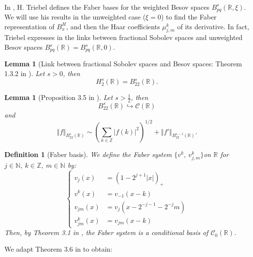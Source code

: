\documentclass[11pt]{enstaPRE}
\newtheorem{defi}{Definition}
\newtheorem{lem}[theo]{Lemma}
\newcommand{\norme}[1]{\left\Vert #1\right\Vert}
\newcommand{\R}{\mathbb{R}}
\newcommand{\Z}{\mathbb{Z}}
\newcommand{\N}{\mathbb{N}}
\begin{document}
\paragraph{}
In \cite{Tri-fab}, H. Triebel defines the Faber bases for the weighted Besov spaces $B^{s}_{pq}(\R,\xi)$. We will use his results in the unweighted case ($\xi = 0$) to find the Faber representation of $B^H_x$, and then the Haar coefficients $\mu^k_{j,m}$ of its derivative. In fact, Triebel expresses in \cite{Tri-fun} the links between fractional Sobolev spaces and unweighted Besov spaces $B^{s}_{pq}(\R)=B^{s}_{pq}(\R,0)$.

\begin{lem}[Link between fractional Sobolev spaces and Besov spaces: Theorem 1.3.2 in \cite{Tri-fun}]
    Let $s>0$, then \begin{equation}
    H^s_2(\R)=B^s_{22}(\R).
    \end{equation}
\end{lem}

\begin{lem}[Proposition 3.5 in \cite{Tri-fab}]\label{emb}
    Let $s>\frac{1}{2}$, then 
    \begin{equation}
    B^s_{22}(\R) \hookrightarrow \mathcal{C}(\R)
    \end{equation}
    and
    \begin{equation}
    \norme{f}_{B^s_{22}(\R)} \sim \left(\sum_{k\in\Z} |f(k)|^2\right)^{1/2}+\norme{f'}_{B^{s-1}_{22}(\R)}.
    \end{equation}
\end{lem}

\begin{defi}[Faber basis]
    We define the Faber system $\{v^k,\ v^k_{j,m}\}$on $\R$ for $j\in\N,\ k\in\Z,\ m\in\N$ by:
    \begin{equation}
    \begin{cases}
    v_j(x) &= (1-2^{j+1}|x|)_+\\
    v^k(x) &= v_{-1}(x-k)\\
    v_{jm}(x) &= v_j(x-2^{-j-1}-2^{-j}m)\\
    v_{jm}^k(x) &= v_{jm}(x-k)
    \end{cases}
    \end{equation}
    Then, by Theorem 3.1 in \cite{Tri-fab}, the Faber system is a conditional basis of $\mathcal{C}_0(\R)$.
\end{defi}

We adapt Theorem 3.6 in \cite{Tri-fab} to obtain:
\end{document}

